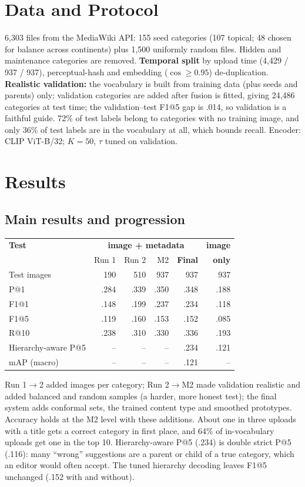 \documentclass[10pt,twocolumn]{article}
\begin{document}
\section{Data and Protocol}
6,303 files from the MediaWiki API: 155 seed categories (107 topical; 48 chosen for balance across
continents) plus 1,500 uniformly random files. Hidden and maintenance categories are
removed. \textbf{Temporal split} by upload time (4,429 / 937 / 937), perceptual-hash and embedding
($\cos\geq0.95$) de-duplication. \textbf{Realistic validation:} the vocabulary is built from training
data (plus seeds and parents) only; validation categories are added after fusion is fitted, giving 24,486
categories at test time; the validation--test F1@5 gap is .014, so validation is a faithful guide.
72\% of test labels belong to categories with no training image, and only 36\% of test labels are in the
vocabulary at all, which bounds recall. Encoder: CLIP ViT-B/32; $K{=}50$, $\tau$ tuned on validation.

\section{Results}
\subsection{Main results and progression}
{\small\centering
\begin{tabular}{@{}lrrrrr@{}}
\toprule
\textbf{Test} & \multicolumn{4}{c}{\textbf{image + metadata}} & \textbf{image} \\
 & Run 1 & Run 2 & M2 & \textbf{Final} & \textbf{only} \\ \midrule
Test images & 190 & 510 & 937 & 937 & 937 \\
P@1 & .284 & .339 & .350 & .348 & .188 \\
F1@1 & .148 & .199 & .237 & .234 & .118 \\
F1@5 & .119 & .160 & .153 & .152 & .085 \\
R@10 & .238 & .310 & .330 & .336 & .193 \\
Hierarchy-aware P@5 & -- & -- & -- & .234 & .121 \\
mAP (macro) & -- & -- & -- & .121 & -- \\ \bottomrule
\end{tabular}\par}

\vspace{2pt}
Run 1$\rightarrow$2 added images per category; Run 2$\rightarrow$M2 made validation realistic and added
balanced and random samples (a harder, more honest test); the final system adds conformal sets, the trained
content type and smoothed prototypes. Accuracy holds at the M2 level with these additions. About one in three uploads with a title gets a correct category in first place, and 64\%
of in-vocabulary uploads get one in the top 10. Hierarchy-aware P@5 (.234) is double strict P@5 (.116):
many ``wrong'' suggestions are a parent or child of a true category, which an editor would often accept.
The tuned hierarchy decoding leaves F1@5 unchanged (.152 with and without).
\end{document}
